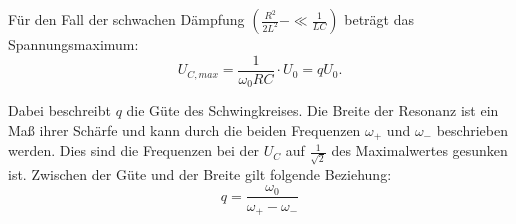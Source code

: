 Für den Fall der schwachen Dämpfung $\left(\frac{R^2}{2L^2} - \ll \frac{1}{LC}\right)$ beträgt das
Spannungsmaximum:
\begin{equation}
  U_{C,max} = \frac{1}{\omega_0 RC} \cdot U_0 = qU_0.
\end{equation}

Dabei beschreibt $q$ die Güte des Schwingkreises.
Die Breite der Resonanz ist ein Maß ihrer Schärfe und kann durch die beiden Frequenzen $\omega_+$ und $\omega_-$ beschrieben werden. Dies sind
die Frequenzen bei der $U_C$ auf $\frac{1}{\sqrt{2}}$ des Maximalwertes gesunken ist. Zwischen der Güte und
der Breite gilt folgende Beziehung:
\begin{equation}
  q = \frac{\omega_0}{\omega_+ - \omega_-}
\end{equation}
